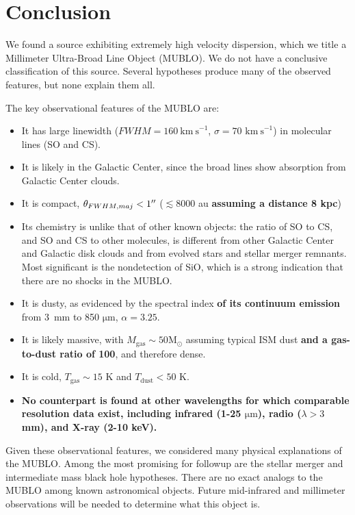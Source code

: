 \documentclass[]{aastex631}
\newcommand{\msun}{\ensuremath{\mathrm{M}_\odot}\xspace}
\newcommand{\kms}{\ensuremath{\mathrm{km~s}^{-1}}\xspace}
\newcommand{\um}{\ensuremath{\mathrm{\mu m}}\xspace}
\newcommand{\threemm}{3~mm\xspace}
\def\rr#1{\textbf{#1}}
\begin{document}
\section{Conclusion}
\label{sec:conclusion}
We found a source exhibiting extremely high velocity dispersion, which we title a Millimeter Ultra-Broad Line Object (MUBLO).
We do not have a conclusive classification of this source.
Several hypotheses produce many of the observed features, but none explain them all.

The key observational features of the MUBLO are:
\begin{itemize}
    \item It has large linewidth ($FWHM=160~\kms$, $\sigma=70$ \kms) in molecular lines (SO and CS).
    \item It is likely in the Galactic Center, since the broad lines show absorption from Galactic Center clouds.
    \item It is compact, $\theta_{FWHM,maj}<1\mbox{$^{\prime\prime}$}$ ($\lesssim8000$ au \rr{assuming a distance 8 kpc})
    \item Its chemistry is unlike that of other known objects: the ratio of SO to CS, and SO and CS to other molecules, is different from other Galactic Center and Galactic disk clouds and from evolved stars and stellar merger remnants.  Most significant is the nondetection of SiO, which is a strong indication that there are no shocks in the MUBLO.
    \item It is dusty, as evidenced by the spectral index \rr{of its continuum emission} from \threemm to 850 \um, $\alpha=3.25$.
    \item It is likely massive, with $M_\mathrm{gas}\sim 50 \msun$ assuming typical ISM dust \rr{and a gas-to-dust ratio of 100}, and therefore dense.
    \item It is cold, $T_\mathrm{gas}\sim15$ K and $T_\mathrm{dust} < 50$ K.
    \item \rr{No counterpart is found at other wavelengths for which comparable resolution data exist, including infrared (1-25 \um), radio ($\lambda > 3$ mm), and X-ray (2-10 keV).}
\end{itemize}

Given these observational features, we considered many physical explanations of the MUBLO.
Among the most promising for followup are the stellar merger and intermediate mass black hole hypotheses.
There are no exact analogs to the MUBLO among known astronomical objects.
Future mid-infrared and millimeter observations will be needed to determine what this object is.
\end{document}
